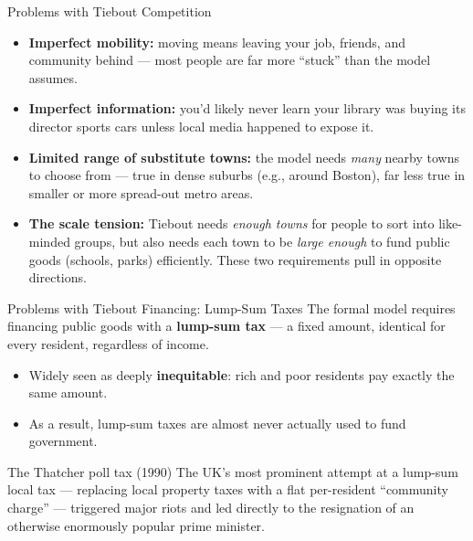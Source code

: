 \documentclass[11pt,aspectratio=169]{beamer}
\begin{document}
\begin{frame}{Problems with Tiebout Competition}
  \small
  \begin{itemize}
    \setlength{\itemsep}{3pt}
    \item \textbf{Imperfect mobility:} moving means leaving your job, friends, and community behind --- most people are far more ``stuck'' than the model assumes.
    \item \textbf{Imperfect information:} you'd likely never learn your library was buying its director sports cars unless local media happened to expose it.
    \item \textbf{Limited range of substitute towns:} the model needs \emph{many} nearby towns to choose from --- true in dense suburbs (e.g., around Boston), far less true in smaller or more spread-out metro areas.
    \item \textbf{The scale tension:} Tiebout needs \emph{enough towns} for people to sort into like-minded groups, but also needs each town to be \emph{large enough} to fund public goods (schools, parks) efficiently. These two requirements pull in opposite directions.
  \end{itemize}
\end{frame}

\begin{frame}{Problems with Tiebout Financing: Lump-Sum Taxes}
  The formal model requires financing public goods with a \textbf{lump-sum tax} --- a fixed amount, identical for every resident, regardless of income.
  \begin{itemize}
    \item Widely seen as deeply \textbf{inequitable}: rich and poor residents pay exactly the same amount.
    \item As a result, lump-sum taxes are almost never actually used to fund government.
  \end{itemize}
  \begin{alertblock}{The Thatcher poll tax (1990)}
    The UK's most prominent attempt at a lump-sum local tax --- replacing local property taxes with a flat per-resident ``community charge'' --- triggered major riots and led directly to the resignation of an otherwise enormously popular prime minister.
  \end{alertblock}
\end{frame}
\end{document}
